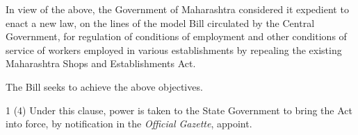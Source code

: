 \documentclass[billwithdocket]{mhact}
\begin{document}
\begin{sor}
\item In view of the above, the Government of Maharashtra considered
  it expedient to enact a new law, on the lines of the model Bill
  circulated by the Central Government, for regulation of conditions
  of employment and other conditions of service of workers employed in
  various establishments by repealing the existing Maharashtra Shops
  and Establishments Act.

\item The Bill seeks to achieve the above objectives.

\end{sor}


\begin{mrdl}
  \begin{dllist}
  \item 1 (4) Under this clause, power is taken to the State Government
    to bring the Act into force, by notification in the \emph{Official
      Gazette}, appoint.


\end{dllist}
\end{mrdl}
\end{document}
